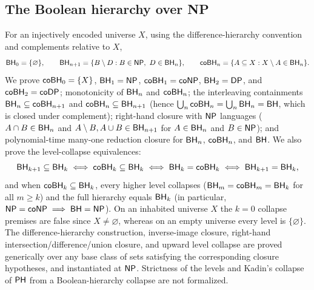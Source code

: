 \begin{result}
\subsection{The Boolean hierarchy over NP}
For an injectively encoded universe $X$, using the difference-hierarchy
convention and complements relative to $X$,
\[
\mathsf{BH}_0=\{\varnothing\},\qquad
\mathsf{BH}_{n+1}=\{B\setminus D:B\in\mathsf{NP},\ D\in\mathsf{BH}_n\},\qquad
\mathsf{coBH}_n=\{A\subseteq X:X\setminus A\in\mathsf{BH}_n\}.
\]
We prove $\mathsf{coBH}_0=\{X\}$, $\mathsf{BH}_1=\mathsf{NP}$, $\mathsf{coBH}_1=\mathsf{coNP}$,
$\mathsf{BH}_2=\mathsf{DP}$, and $\mathsf{coBH}_2=\mathsf{coDP}$; monotonicity of
$\mathsf{BH}_n$ and $\mathsf{coBH}_n$; the interleaving containments
$\mathsf{BH}_n\subseteq\mathsf{coBH}_{n+1}$ and $\mathsf{coBH}_n\subseteq\mathsf{BH}_{n+1}$
(hence $\bigcup_n\mathsf{coBH}_n=\bigcup_n\mathsf{BH}_n=\mathsf{BH}$, which is closed under
complement); right-hand closure with $\mathsf{NP}$ languages ($A\cap B\in\mathsf{BH}_n$
and $A\setminus B,A\cup B\in\mathsf{BH}_{n+1}$ for $A\in\mathsf{BH}_n$ and
$B\in\mathsf{NP}$); and polynomial-time many-one reduction closure for $\mathsf{BH}_n$,
$\mathsf{coBH}_n$, and $\mathsf{BH}$. We also prove the level-collapse equivalences:
\[
\mathsf{BH}_{k+1}\subseteq\mathsf{BH}_k
\iff \mathsf{coBH}_k\subseteq\mathsf{BH}_k
\iff \mathsf{BH}_k=\mathsf{coBH}_k
\iff \mathsf{BH}_{k+1}=\mathsf{BH}_k,
\]
and when $\mathsf{coBH}_k\subseteq\mathsf{BH}_k$, every higher level collapses
($\mathsf{BH}_m=\mathsf{coBH}_m=\mathsf{BH}_k$ for all $m\ge k$) and the full hierarchy
equals $\mathsf{BH}_k$ (in particular, $\mathsf{NP}=\mathsf{coNP}\implies\mathsf{BH}=\mathsf{NP}$).
On an inhabited universe $X$ the $k=0$ collapse premises are false since
$X\ne\varnothing$, whereas on an empty universe every level is $\{\varnothing\}$.
The difference-hierarchy construction, inverse-image closure, right-hand
intersection/difference/union closure, and upward level collapse are proved
generically over any base class of sets satisfying the corresponding closure
hypotheses, and instantiated at $\mathsf{NP}$. Strictness of the levels and Kadin's
collapse of $\mathsf{PH}$ from a Boolean-hierarchy collapse are not
formalized.\citep{CaiEtAl1988,Kadin1988}

\end{result}
